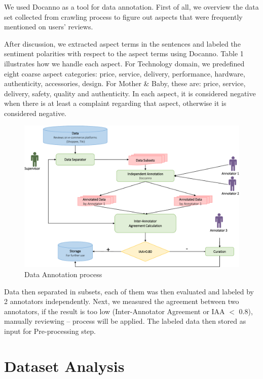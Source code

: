 We used Docanno as a tool for data annotation. First of all, we overview the data set collected from crawling process to figure out aspects that were frequently mentioned on users’ reviews. 

After discussion, we extracted aspect terms in the sentences and labeled the sentiment polarities with respect to the aspect terms using Docanno. Table 1 illustrates how we handle each aspect. For Technology domain, we predefined eight coarse aspect categories: price, service, delivery, performance, hardware, authenticity, accessories, design. For Mother \& Baby, these are: price, service, delivery, safety, quality and authenticity. In each aspect, it is considered negative when there is at least a complaint regarding that aspect, otherwise it is considered negative.

\begin{figure}[h]
	\centering
	\includegraphics[width=\linewidth]{Chapter2/Figs/annotation.pdf}
	\caption{Data Annotation process}
	\label{fig:annotation}
\end{figure}

Data then separated in subsets, each of them was then evaluated and labeled by 2 annotators independently. Next, we measured the agreement between two annotators, if the result is too low (Inter-Annotator Agreement or IAA \(<\) 0.8), manually reviewing – process will be applied. The labeled data then stored as input for Pre-processing step. 

\section{Dataset Analysis}
\label{sec:data-analysis}
